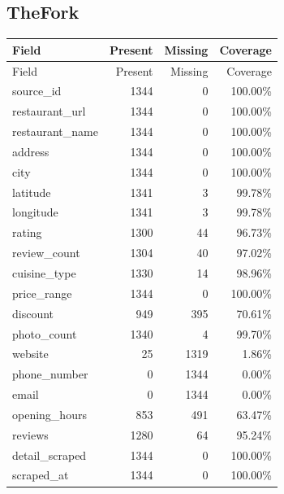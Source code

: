 \subsection{TheFork}
{\small
\begin{longtable}{lrrr}
\toprule
Field & Present & Missing & Coverage \\
\midrule
\endfirsthead
\toprule
Field & Present & Missing & Coverage \\
\midrule
\endhead
source\_id & 1344 & 0 & 100.00\% \\
restaurant\_url & 1344 & 0 & 100.00\% \\
restaurant\_name & 1344 & 0 & 100.00\% \\
address & 1344 & 0 & 100.00\% \\
city & 1344 & 0 & 100.00\% \\
latitude & 1341 & 3 & 99.78\% \\
longitude & 1341 & 3 & 99.78\% \\
rating & 1300 & 44 & 96.73\% \\
review\_count & 1304 & 40 & 97.02\% \\
cuisine\_type & 1330 & 14 & 98.96\% \\
price\_range & 1344 & 0 & 100.00\% \\
discount & 949 & 395 & 70.61\% \\
photo\_count & 1340 & 4 & 99.70\% \\
website & 25 & 1319 & 1.86\% \\
phone\_number & 0 & 1344 & 0.00\% \\
email & 0 & 1344 & 0.00\% \\
opening\_hours & 853 & 491 & 63.47\% \\
reviews & 1280 & 64 & 95.24\% \\
detail\_scraped & 1344 & 0 & 100.00\% \\
scraped\_at & 1344 & 0 & 100.00\% \\
\bottomrule
\end{longtable}
}
